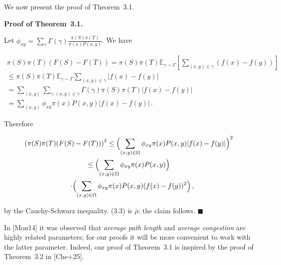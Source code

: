 \documentclass[10pt,a4paper]{article}
\begin{document}



We now present the proof of Theorem 3.1.\par




\par\medskip\noindent\textbf{Proof of Theorem 3.1.}\par



Let $\phi_{xy}=\sum_{\gamma}\Gamma(\gamma)\frac{\pi(S)\pi(T)}{\pi(x)P(x,y)}$. We have\par


\[\begin{gathered}
\displaystyle\pi(S)\pi(T)(F(S)-F(T)) \displaystyle=\pi(S)\pi(T)\mathbb{E}_{\gamma\sim\Gamma}\left[\sum_{(x,y)\in\gamma}(f(x)-f(y))\right] \\
\displaystyle\leq\pi(S)\pi(T)\mathbb{E}_{\gamma\sim\Gamma}\sum_{(x,y)\in\gamma}|f(x)-f(y)| \\
\displaystyle=\sum_{(x,y)}\sum_{\gamma:(x,y)\in\gamma}\Gamma(\gamma)\pi(S)\pi(T)|f(x)-f(y)| \\
\displaystyle=\sum_{(x,y)}\phi_{xy}\pi(x)P(x,y)|f(x)-f(y)|\,.
\end{gathered}\]




Therefore\par


\[\begin{gathered}
\displaystyle\left(\pi(S)\pi(T)(F(S)-F(T))\right)^{2} \displaystyle\leq\Bigl(\sum_{(x,y)\in\Omega}\phi_{xy}\pi(x)P(x,y)|f(x)-f(y)|\Bigr)^{2} \\
\displaystyle\leq\Bigl(\sum_{(x,y)\in\Omega}\phi_{xy}\pi(x)P(x,y)\Bigr) \\
\displaystyle\quad\cdot\Bigl(\sum_{(x,y)\in\Omega}\phi_{xy}\pi(x)P(x,y)(f(x)-f(y))^{2}\Bigr)\,,
\end{gathered}\]


by the Cauchy-Schwarz inequality. (3.3) is $\bar{\rho}$; the claim follows.
\ensuremath{\blacksquare}\par





In [Mon14] it was observed that \emph{average path length} and \emph{average congestion} are highly related parameters; for our proofs it will be more convenient to work with the latter parameter. Indeed, our proof of Theorem 3.1 is inspired by the proof of Theorem 3.2 in [Che+25].\par
\end{document}
